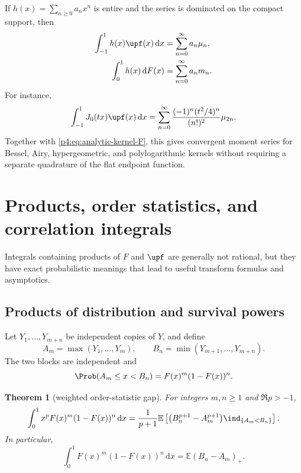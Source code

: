 \documentclass[11pt,oneside]{article}
\newtheorem{theorem}{Theorem}[section]
\theoremstyle{definition}
\theoremstyle{remark}
\newcommand{\F}{F}
\newcommand{\E}{\mathbb E}
\newcommand{\dd}{\,\mathrm d}
\newcommand{\1}{\mathbf 1}
\begin{document}
If \(h(x)=\sum_{n\ge0}a_nx^n\) is entire and the series is dominated on the compact
support, then
\begin{align}
 \int_{-1}^1h(x)\upf(x)\dd x
 &=\sum_{n=0}^{\infty}a_n\mu_n,
 \label{p4:eq:entire-kernel-up}\\
 \int_0^1h(x)\dd\F(x)
 &=\sum_{n=0}^{\infty}a_nm_n.
 \label{p4:eq:entire-kernel-dF}
\end{align}
For instance,
\begin{equation}\label{p4:eq:Bessel-up}
 \int_{-1}^1J_0(tx)\upf(x)\dd x
 =\sum_{n=0}^{\infty}
 \frac{(-1)^n(t^2/4)^n}{(n!)^2}\mu_{2n}.
\end{equation}
Together with \cref{p4:eq:analytic-kernel-F}, this gives convergent moment series for
Bessel, Airy, hypergeometric, and polylogarithmic kernels without requiring a separate
quadrature of the flat endpoint function.

\section{Products, order statistics, and correlation integrals}

Integrals containing products of \(\F\) and \(\upf\) are generally not rational, but
they have exact probabilistic meanings that lead to useful transform formulas and
asymptotics.

\subsection{Products of distribution and survival powers}

Let \(Y_1,\ldots,Y_{m+n}\) be independent copies of \(Y\), and define
\begin{equation}\label{p4:eq:Amax-Bmin}
 A_m=\max(Y_1,\ldots,Y_m),
 \qquad
 B_n=\min(Y_{m+1},\ldots,Y_{m+n}).
\end{equation}
The two blocks are independent and
\begin{equation}\label{p4:eq:gap-event}
 \Prob(A_m\le x<B_n)=\F(x)^m(1-\F(x))^n.
\end{equation}

\begin{theorem}[weighted order-statistic gap]\label{p4:thm:order-gap}
For integers \(m,n\ge1\) and \(\Re p>-1\),
\begin{equation}\label{p4:eq:weighted-gap}
 \int_0^1x^p\F(x)^m(1-\F(x))^n\dd x
 =\frac1{p+1}\E\left[
 \bigl(B_n^{p+1}-A_m^{p+1}\bigr)\ind_{\{A_m<B_n\}}
 \right].
\end{equation}
In particular,
\begin{equation}\label{p4:eq:gap-unweighted}
 \int_0^1\F(x)^m(1-\F(x))^n\dd x
 =\E(B_n-A_m)_+.
\end{equation}
\end{theorem}
\end{document}

